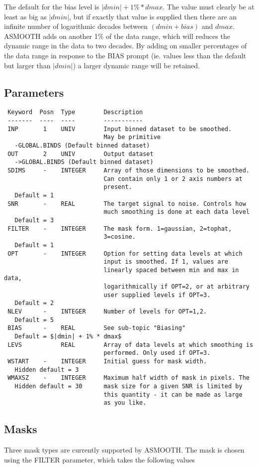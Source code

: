 \documentclass{book}
\renewcommand{\_}{{\tt\char'137}}     %
\begin{document}
The default for the bias level is $|dmin| + 1\% * dmax$. The value
must clearly be at least as big as $|dmin|$, but if exactly that value
is supplied then there are an infinite number of logarithmic
decades between $(dmin+bias)$ and $dmax$. ASMOOTH adds on another 1\%
of the data range, which will reduces the dynamic range in the
data to two decades. By adding on smaller percentages of the data
range in response to the BIAS prompt (ie. values less than the
default but larger than $|dmin|$) a larger dynamic range will be
retained.

\subsection{Parameters}
\begin{verbatim}
 Keyword  Posn  Type        Description
 -------  ----  ----        -----------
 INP       1    UNIV        Input binned dataset to be smoothed.
                            May be primitive
   -GLOBAL.BINDS (Default binned dataset)
 OUT       2    UNIV        Output dataset
   ->GLOBAL.BINDS (Default binned dataset)
 SDIMS     -    INTEGER     Array of those dimensions to be smoothed.
                            Can contain only 1 or 2 axis numbers at
                            present.
   Default = 1
 SNR       -    REAL        The target signal to noise. Controls how
                            much smoothing is done at each data level
   Default = 3
 FILTER    -    INTEGER     The mask form. 1=gaussian, 2=tophat,
                            3=cosine.
   Default = 1
 OPT       -    INTEGER     Option for setting data levels at which
                            input is smoothed. If 1, values are
                            linearly spaced between min and max in data,
                            logarithmically if OPT=2, or at arbitrary
                            user supplied levels if OPT=3.
   Default = 2
 NLEV      -    INTEGER     Number of levels for OPT=1,2.
   Default = 5
 BIAS      -    REAL        See sub-topic "Biasing"
   Default = $|dmin| + 1% * dmax$
 LEVS           REAL        Array of data levels at which smoothing is
                            performed. Only used if OPT=3.
 WSTART    -    INTEGER     Initial guess for mask width.
   Hidden default = 3
 WMAXSZ    -    INTEGER     Maximum half width of mask in pixels. The
   Hidden default = 30      mask size for a given SNR is limited by
                            this quantity - it can be made as large
                            as you like.

\end{verbatim}\subsection{Masks}
Three mask types are currently supported by ASMOOTH. The mask is
chosen using the FILTER parameter, which takes the following values
\end{document}
